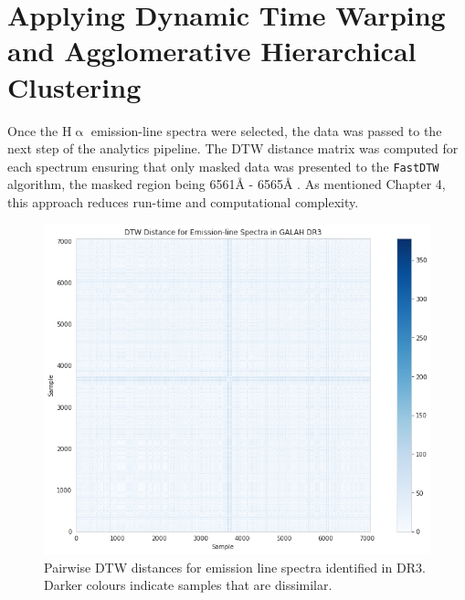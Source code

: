 \section{Applying Dynamic Time Warping and Agglomerative Hierarchical Clustering}

Once the H$\upalpha$ emission-line spectra were selected, the data was passed to the next step of the analytics pipeline. The DTW distance matrix was computed for each spectrum ensuring that only masked data was presented to the \texttt{FastDTW} algorithm, the masked region being 6561\r{A} - 6565\r{A} \citep{traven2017galah}. As mentioned Chapter 4, this approach reduces run-time and computational complexity. 

\begin{figure}[!htb]
\centering
\includegraphics[scale=0.50]{figures/dtw distances dr3.png}
\caption{Pairwise DTW distances for emission line spectra identified in DR3. Darker colours indicate samples that are dissimilar.}
\end{figure}

